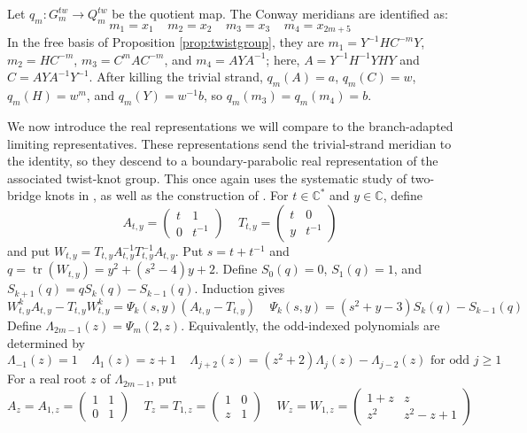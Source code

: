 \documentclass{article}
\DeclareMathOperator{\tr}{tr}
\theoremstyle{plain}
\theoremstyle{definition}
\theoremstyle{plain}
\theoremstyle{plain}
\theoremstyle{plain}
\theoremstyle{remark}
\theoremstyle{remark}
\theoremstyle{plain}
\theoremstyle{plain}
\theoremstyle{plain}
\theoremstyle{plain}
\begin{document}
Let $q_m: G_m^{tw} \to Q_m^{tw}$ be the quotient map. The Conway meridians are identified as:
\begin{equation*}
	m_1 = x_1 \ \ \ \ \ m_2 = x_2 \ \ \ \ \ m_3 = x_3 \ \ \ \ \ m_4 = x_{2m+5}
\end{equation*}
In the free basis of Proposition \ref{prop:twistgroup}, they are $m_1 = Y^{-1}HC^{-m}Y$, $m_2 = HC^{-m}$, $m_3 = C^mAC^{-m}$, and $m_4 = AYA^{-1}$; here, $A = Y^{-1}H^{-1}YHY$ and $C = AYA^{-1}Y^{-1}$. After killing the trivial strand, $q_m(A) = a$, $q_m(C) = w$, $q_m(H) = w^m$, and $q_m(Y) = w^{-1}b$, so $q_m(m_3) = q_m(m_4) = b$.  

\medskip

We now introduce the real representations we will compare to the branch-adapted limiting representatives. These representations send the trivial-strand meridian to the identity, so they descend to a boundary-parabolic real representation of the associated twist-knot group. This once again uses the systematic study of two-bridge knots in \cite{riley}, as well as the construction of \cite{hosteshanahan}. For $t \in \mathbb C^*$ and $y \in \mathbb C$, define
\begin{equation*}
	A_{t,y} = \begin{pmatrix}t & 1\\ 0 & t^{-1}\end{pmatrix} \ \ \ \ \
	T_{t,y} = \begin{pmatrix}t & 0\\ y & t^{-1}\end{pmatrix}
\end{equation*}
and put $W_{t,y} = T_{t,y}A_{t,y}^{-1}T_{t,y}^{-1}A_{t,y}$. Put $s = t + t^{-1}$ and $q = \tr(W_{t,y}) = y^2 + (s^2-4)y + 2$. Define $S_0(q) = 0$, $S_1(q) = 1$, and $S_{k+1}(q) = qS_k(q) - S_{k-1}(q)$. Induction gives
\begin{equation}\label{eq:psiidentity}
	W_{t,y}^kA_{t,y} - T_{t,y}W_{t,y}^k = \Psi_k(s, y)(A_{t,y} - T_{t,y}) \ \ \ \ \ \Psi_k(s,y) = (s^2 + y - 3)S_k(q) - S_{k-1}(q)
\end{equation}
Define $\Lambda_{2m-1}(z) = \Psi_m(2, z)$. Equivalently, the odd-indexed polynomials are determined by 
\begin{equation*}
	\Lambda_{-1}(z) = 1 \ \ \ \ \ \Lambda_1(z) = z + 1 \ \ \ \ \
	\Lambda_{j+2}(z) = (z^2+2)\Lambda_j(z) - \Lambda_{j-2}(z) \text{ for odd } j \geq 1
\end{equation*}
For a real root $z$ of $\Lambda_{2m-1}$, put
\begin{equation*}
	A_z = A_{1,z} = \begin{pmatrix}1 & 1 \\ 0 & 1\end{pmatrix} \ \ \ \ \ T_z = T_{1,z} = \begin{pmatrix}1 & 0 \\ z & 1\end{pmatrix} \ \ \ \ \ W_z = W_{1,z} = \begin{pmatrix}1+z&z\\z^2 & z^2 - z + 1\end{pmatrix}
\end{equation*} 
\end{document}
